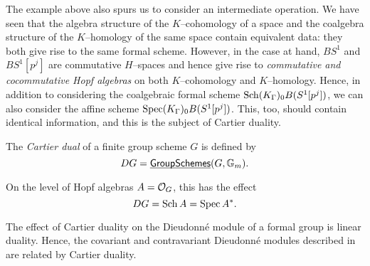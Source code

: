 The example above also spurs us to consider an intermediate operation.  We have seen that the algebra structure of the $K$--cohomology of a space and the coalgebra structure of the $K$--homology of the same space contain equivalent data: they both give rise to the same formal scheme.  However, in the case at hand, $BS^1$ and $BS^1[p^j]$ are commutative $H$--spaces and hence give rise to \emph{commutative and cocommutative Hopf algebras} on both $K$--cohomology and $K$--homology.  Hence, in addition to considering the coalgebraic formal scheme $\operatorname{Sch} (K_\Gamma)_0 B(S^1[p^j])$, we can also consider the affine scheme $\operatorname{Spec} (K_\Gamma)_0 B(S^1[p^j])$.  This, too, should contain identical information, and this is the subject of Cartier duality.

\begin{definition}
The \textit{Cartier dual} of a finite group scheme $G$ is defined by \[DG = \operatorname{\underline{\smash{\mathsf{GroupSchemes}}}}(G, \mathbb G_m).\]
\end{definition}

\begin{lemma}
On the level of Hopf algebras $A = \mathcal{O}_G$, this has the effect \[DG = \Sch A = \Spec A^*. \qed\]
\end{lemma}

\begin{remark}
The effect of Cartier duality on the Dieudonn\'e module of a formal group is linear duality.  Hence, the covariant and contravariant Dieudonn\'e modules described in  are related by Cartier duality.
\end{remark}

